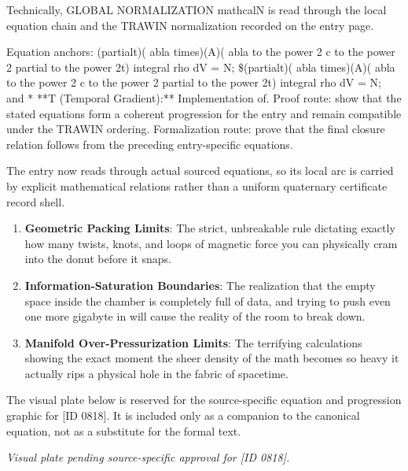 Technically, GLOBAL NORMALIZATION mathcalN is read through the local equation chain and the TRAWIN normalization recorded on the entry page.

Equation anchors: (partialt)( abla times)(A)( abla to the power 2   c to the power  2 partial to the power 2t) integral rho dV = N; \$(partialt)( abla times)(A)( abla to the power 2   c to the power  2 partial to the power 2t) integral rho dV = N; and * **T (Temporal Gradient):** Implementation of. Proof route: show that the stated equations form a coherent progression for the entry and remain compatible under the TRAWIN ordering. Formalization route: prove that the final closure relation follows from the preceding entry-specific equations.

The entry now reads through actual sourced equations, so its local arc is carried by explicit mathematical relations rather than a uniform quaternary certificate record shell.
\endgroup

\begin{enumerate}[leftmargin=1.6em,itemsep=6pt,topsep=4pt]
\item \textbf{Geometric Packing Limits}: The strict, unbreakable rule dictating exactly how many twists, knots, and loops of magnetic force you can physically cram into the donut before it snaps.
\item \textbf{Information-Saturation Boundaries}: The realization that the empty space inside the chamber is completely full of data, and trying to push even one more gigabyte in will cause the reality of the room to break down.
\item \textbf{Manifold Over-Pressurization Limits}: The terrifying calculations showing the exact moment the sheer density of the math becomes so heavy it actually rips a physical hole in the fabric of spacetime.
\end{enumerate}

\begingroup\footnotesize\sloppy
The visual plate below is reserved for the source-specific equation and progression graphic for [ID 0818]. It is included only as a companion to the canonical equation, not as a substitute for the formal text.
\par\endgroup
\begingroup\footnotesize\itshape
Visual plate pending source-specific approval for [ID 0818].
\par\endgroup

